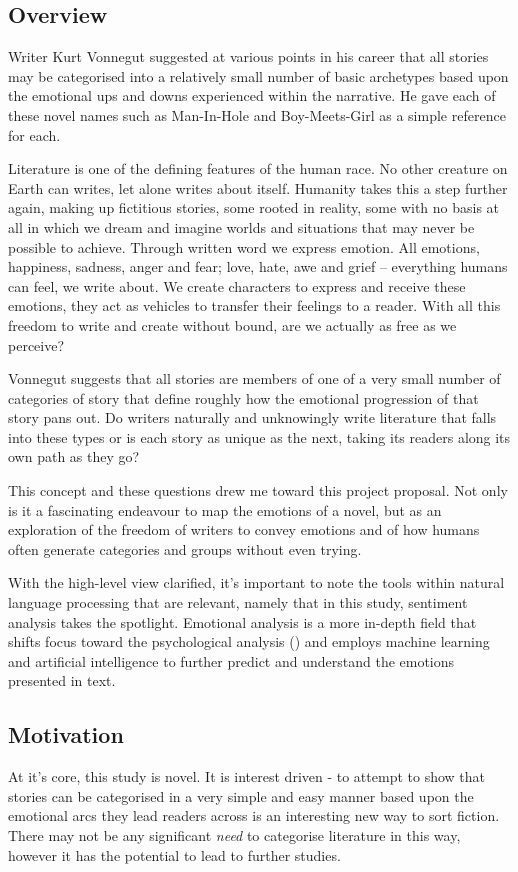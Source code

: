 \documentclass{article}
\begin{document}
    \subsection{Overview}
        Writer Kurt Vonnegut suggested at various points in his career that all stories may be categorised into a relatively small number of basic archetypes based upon the emotional ups and downs experienced within the narrative. He gave each of these novel names such as Man-In-Hole and Boy-Meets-Girl as a simple reference for each. \cite{vonnegutLecture}

        Literature is one of the defining features of the human race. No other creature on Earth can writes, let alone writes about itself. Humanity takes this a step further again, making up fictitious stories, some rooted in reality, some with no basis at all in which we dream and imagine worlds and situations that may never be possible to achieve. Through written word we express emotion. All emotions, happiness, sadness, anger and fear; love, hate, awe and grief – everything humans can feel, we write about. We create characters to express and receive these emotions, they act as vehicles to transfer their feelings to a reader. With all this freedom to write and create without bound, are we actually as free as we perceive?

        Vonnegut suggests that all stories are members of one of a very small number of categories of story that define roughly how the emotional progression of that story pans out. Do writers naturally and unknowingly write literature that falls into these types or is each story as unique as the next, taking its readers along its own path as they go?

        This concept and these questions drew me toward this project proposal. Not only is it a fascinating endeavour to map the emotions of a novel, but as an exploration of the freedom of writers to convey emotions and of how humans often generate categories and groups without even trying.

        With the high-level view clarified, it's important to note the tools within natural language processing that are relevant, namely that in this study, sentiment analysis takes the spotlight. Emotional analysis is a more in-depth field that shifts focus toward the psychological analysis (\cite{sentimentVsEmotionAnalysis}) and employs machine learning and artificial intelligence to further predict and understand the emotions presented in text.
    \subsection{Motivation}
        At it's core, this study is novel. It is interest driven - to attempt to show that stories can be categorised in a very simple and easy manner based upon the emotional arcs they lead readers across is an interesting new way to sort fiction. There may not be any significant \emph{need} to categorise literature in this way, however it has the potential to lead to further studies.
\end{document}
